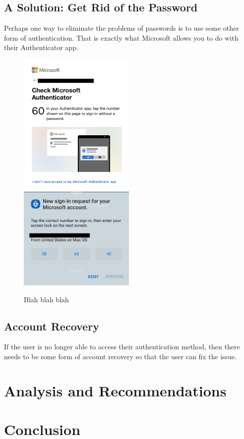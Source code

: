 \documentclass[12pt, letterpaper]{article}
\begin{document}

\subsection{A Solution: Get Rid of the Password}
Perhaps one way to eliminate the problems of passwords is to use some other form of authentication.
That is exactly what Microsoft allows you to do with their Authenticator app. 

\begin{figure}[h]
\includegraphics[width=0.5\textwidth]{mslogin.png}
\includegraphics[width=0.5\textwidth]{authenticator.png}
\caption{Blah blah blah\label{msauth}}
\end{figure}

\subsection{Account Recovery}
If the user is no longer able to access their authentication method, then there needs to be some form of account recovery so that the user can fix the issue.

\section{Analysis and Recommendations}
\section{Conclusion}

\printbibliography
\end{document}
